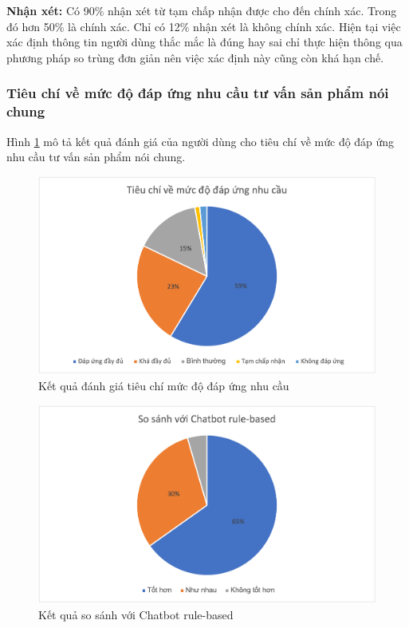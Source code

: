 \textbf{Nhận xét:}
Có 90\% nhận xét từ tạm chấp nhận được cho đến chính xác. Trong đó hơn 50\% là chính xác. Chỉ có 12\% nhận xét là không chính xác. Hiện tại việc xác định thông tin người dùng thắc mắc là đúng hay sai chỉ thực hiện thông qua phương pháp so trùng đơn giản nên việc xác định này cũng còn khá hạn chế.

\subsubsection{Tiêu chí về mức độ đáp ứng nhu cầu tư vấn sản phẩm nói chung}
Hình \ref{fig:tieuchi6} mô tả kết quả đánh giá của người dùng cho tiêu chí về mức độ đáp ứng nhu cầu tư vấn sản phẩm nói chung.

\begin{center}
    \begin{figure}[h!]
        \begin{center}
         \includegraphics[scale=0.91]{chapter7/img/tieuchi6.png}
        \end{center}
        \caption{Kết quả đánh giá tiêu chí mức độ đáp ứng nhu cầu}
        \label{fig:tieuchi6}
    \end{figure}
\end{center}

\begin{center}
    \begin{figure}[h!]
        \begin{center}
         \includegraphics[scale=0.91]{chapter7/img/tieuchi6_2.png}
        \end{center}
        \caption{Kết quả so sánh với Chatbot rule-based}
        \label{fig:tieuchi62}
    \end{figure}
\end{center}

